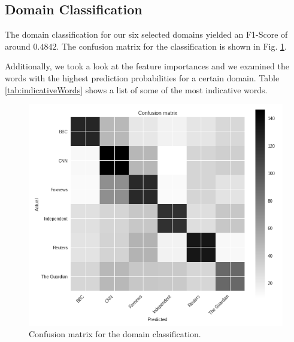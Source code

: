 \documentclass[final]{ieee}
\begin{document}
\subsection{Domain Classification}

The domain classification for our six selected domains yielded an F1-Score of around $0.4842$. The confusion matrix for the classification is shown in Fig. \ref{fig:classificationConfusionMatrix}.

Additionally, we took a look at the feature importances and we examined the words with the highest prediction probabilities for a certain domain. Table \ref{tab:indicativeWords} shows a list of some of the most indicative words.

\begin{figure}[!hbt]
  \centering
    \includegraphics[width=\columnwidth]{classificationConfusionMatrix.png}
    \caption{Confusion matrix for the domain classification.}
  \label{fig:classificationConfusionMatrix}
\end{figure}
            


\end{document}

